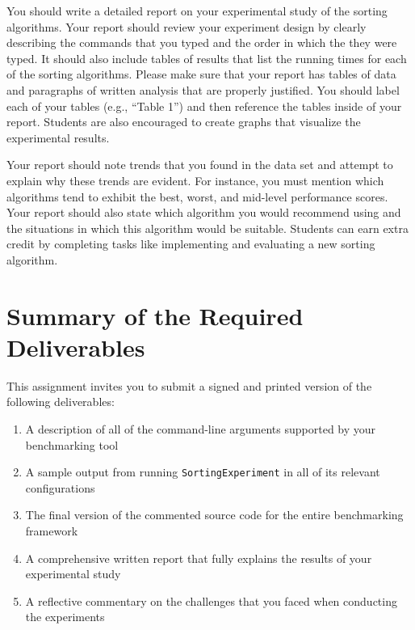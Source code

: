 You should write a detailed report on your experimental study of the sorting algorithms.  Your report should review your
experiment design by clearly describing the commands that you typed and the order in which the they were typed.  It
should also include tables of results that list the running times for each of the sorting algorithms.  Please make sure
that your report has tables of data and paragraphs of written analysis that are properly justified.  You should label
each of your tables (e.g., ``Table 1'') and then reference the tables inside of your report.  Students are also
encouraged to create graphs that visualize the experimental results.  

Your report should note trends that you found in the data set and attempt to explain why these trends are evident.  For
instance, you must mention which algorithms tend to exhibit the best, worst, and mid-level performance scores.  Your
report should also state which algorithm you would recommend using and the situations in which this algorithm would be
suitable. Students can earn extra credit by completing tasks like implementing and evaluating a new sorting algorithm.

\section*{Summary of the Required Deliverables}

  This assignment invites you to submit a signed and printed version of the following deliverables: 

  \begin{enumerate} 
  \itemsep0pt
  \item A description of all of the command-line arguments supported by your benchmarking tool 

  \item A sample output from running {\tt SortingExperiment} in all of its relevant configurations

  \item The final version of the commented source code for the entire benchmarking framework 

  \item A comprehensive written report that fully explains the results of your experimental study

  \item A reflective commentary on the challenges that you faced when conducting the experiments
   
  \end{enumerate}

